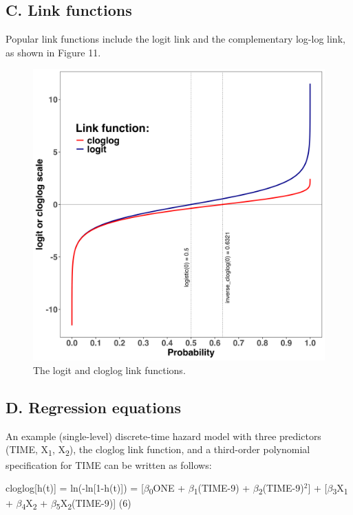 \documentclass[
  man, donotrepeattitle,floatsintext]{apa6}
\begin{document}
\subsection{C. Link functions}\label{c.-link-functions}

Popular link functions include the logit link and the complementary log-log link, as shown in Figure 11.



\begin{figure}[H]

{\centering \includegraphics[width=0.8\linewidth,height=0.67\textheight,]{../Tutorial_2_Bayesian/figures/linkfunctions} 

}

\caption{The logit and cloglog link functions.}\label{fig:plot-link-functions}
\end{figure}

\subsection{D. Regression equations}\label{d.-regression-equations}

An example (single-level) discrete-time hazard model with three predictors (TIME, X\textsubscript{1}, X\textsubscript{2}), the cloglog link function, and a third-order polynomial specification for TIME can be written as follows:

\noindent cloglog{[}h(t){]} = ln(-ln{[}1-h(t){]}) = {[}\(\beta\)\textsubscript{0}ONE + \(\beta\)\textsubscript{1}(TIME-9) + \(\beta\)\textsubscript{2}(TIME-9)\(^2\){]} + {[}\(\beta\)\textsubscript{3}X\textsubscript{1} + \(\beta\)\textsubscript{4}X\textsubscript{2} + \(\beta\)\textsubscript{5}X\textsubscript{2}(TIME-9){]} \hfill  (6)
\end{document}
